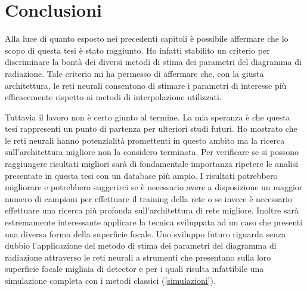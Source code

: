 \documentclass[12pt,a4paper,final]{book}
\begin{document}

\chapter{Conclusioni}\label{conclusioni}
Alla luce di quanto esposto nei precedenti capitoli è possibile affermare che lo scopo di questa tesi è stato raggiunto. Ho infatti stabilito un criterio per discriminare la bontà dei diversi metodi di stima dei parametri del diagramma di radiazione. Tale criterio mi ha permesso di affermare che, con la giusta architettura, le reti neurali consentono di stimare i parametri di interesse più efficacemente rispetto ai metodi di interpolazione utilizzati.

Tuttavia il lavoro non è certo giunto al termine. La mia speranza è che questa tesi rappresenti un punto di partenza per ulteriori studi futuri. Ho mostrato che le reti neurali hanno potenzialità promettenti in questo ambito ma la ricerca sull'architettura migliore non la considero terminata. 
Per verificare se si possono raggiungere risultati migliori sarà di fondamentale importanza ripetere le analisi presentate in questa tesi con un database più ampio. I risultati potrebbero migliorare e potrebbero suggerirci se è necessario avere a disposizione un maggior numero di campioni  per effettuare il training della rete o se invece è necessario effettuare una ricerca più profonda sull'architettura di rete migliore.
Inoltre sarà estremamente interessante applicare la tecnica sviluppata ad un caso che presenti una diversa forma della superficie focale.
Uno sviluppo futuro riguarda senza dubbio l'applicazione del metodo di stima dei parametri del diagramma di radiazione attraverso le reti neurali a strumenti che presentano sulla loro superficie focale migliaia di detector e per i quali risulta infattibile una simulazione completa con i metodi classici (\ref{simulazioni}).
\end{document}

